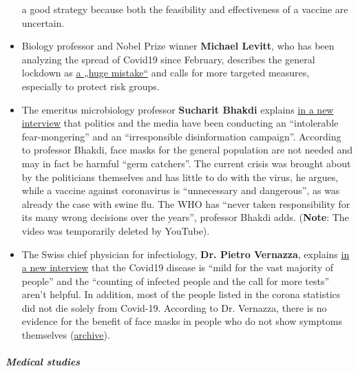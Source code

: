\begin{itemize}
  a good strategy because both the feasibility and effectiveness of a
  vaccine are uncertain.
\item
  Biology professor and Nobel Prize winner \textbf{Michael Levitt}, who
  has been analyzing the spread of Covid19 since February, describes the
  general lockdown as
  \href{https://www.youtube.com/watch?v=bl-sZdfLcEk}{a „huge mistake``}
  and calls for more targeted measures, especially to protect risk
  groups.
\item
  The emeritus microbiology professor \textbf{Sucharit Bhakdi} explains
  \href{https://www.servustv.com/videos/aa-23zjmvcz51w12/}{in a new
  interview} that politics and the media have been conducting an
  ``intolerable fear-mongering'' and an ``irres­pon­sible disinformation
  campaign''. According to professor Bhakdi, face masks for the general
  population are not needed and may in fact be harmful ``germ
  catchers''. The current crisis was brought about by the politicians
  themselves and has little to do with the virus, he argues, while a
  vaccine against coronavirus is ``unnecessary and dangerous'', as was
  already the case with swine flu. The WHO has ``never taken
  responsibility for its many wrong decisions over the years'',
  professor Bhakdi adds. (\textbf{Note}: The video was temporarily
  deleted by YouTube).
\item
  The Swiss chief physician for infectiology, \textbf{Dr. Pietro
  Vernazza}, explains
  \href{https://www.saldo.ch/artikel/artikeldetail/fuer-die-allermeisten-menschen-verlaeuft-die-erkrankung-mild/}{in
  a new interview} that the Covid19 disease is ``mild for the vast
  majority of people'' and the ``counting of infected people and the
  call for more tests'' aren't helpful. In addition, most of the people
  listed in the corona statistics did not die solely from Covid-19.
  According to Dr. Vernazza, there is no evidence for the benefit of
  face masks in people who do not show symptoms themselves
  (\href{https://swprs.files.wordpress.com/2020/05/saldo-interview-pietro-vernazza-14-04-2020.pdf}{archive}).
\end{itemize}

\hypertarget{medical-studies}{%
\subparagraph{\texorpdfstring{\textbf{Medical
studies}}{Medical studies}}\label{medical-studies}}

